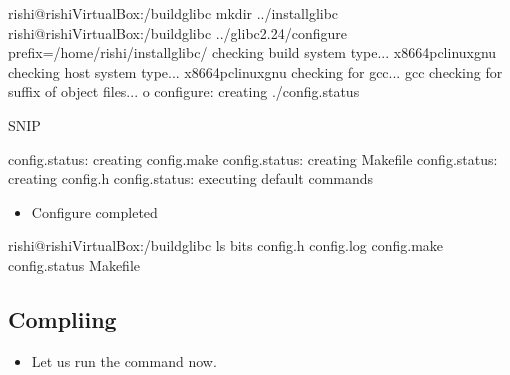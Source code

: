\documentclass[letterpaper,10pt,english]{sphinxmanual}
\begin{document}
\begin{sphinxVerbatim}[commandchars=\\\{\}]
rishi@rishi\PYGZhy{}VirtualBox:\PYGZti{}/build\PYGZus{}glibc\PYGZdl{} mkdir ../install\PYGZus{}glibc
rishi@rishi\PYGZhy{}VirtualBox:\PYGZti{}/build\PYGZus{}glibc\PYGZdl{} ../glibc\PYGZhy{}2.24/configure \PYGZhy{}\PYGZhy{}prefix=/home/rishi/install\PYGZus{}glibc/
checking build system type... x86\PYGZus{}64\PYGZhy{}pc\PYGZhy{}linux\PYGZhy{}gnu
checking host system type... x86\PYGZus{}64\PYGZhy{}pc\PYGZhy{}linux\PYGZhy{}gnu
checking for gcc... gcc
checking for suffix of object files... o
configure: creating ./config.status

\PYGZgt{}\PYGZgt{}\PYGZgt{}\PYGZgt{}\PYGZgt{}\PYGZgt{}\PYGZgt{}SNIP\PYGZlt{}\PYGZlt{}\PYGZlt{}\PYGZlt{}\PYGZlt{}\PYGZlt{}\PYGZlt{}\PYGZlt{}\PYGZlt{}\PYGZlt{}\PYGZlt{}\PYGZlt{}

config.status: creating config.make
config.status: creating Makefile
config.status: creating config.h
config.status: executing default commands
\end{sphinxVerbatim}
\begin{itemize}
\item {} 
Configure completed

\end{itemize}

\begin{sphinxVerbatim}[commandchars=\\\{\}]
rishi@rishi\PYGZhy{}VirtualBox:\PYGZti{}/build\PYGZus{}glibc\PYGZdl{} ls
bits  config.h  config.log  config.make  config.status  Makefile
\end{sphinxVerbatim}


\subsection{Compliing}
\label{\detokenize{03_glibc:compliing}}\begin{itemize}
\item {} 
Let us run the  command now.

\end{itemize}
\end{document}
